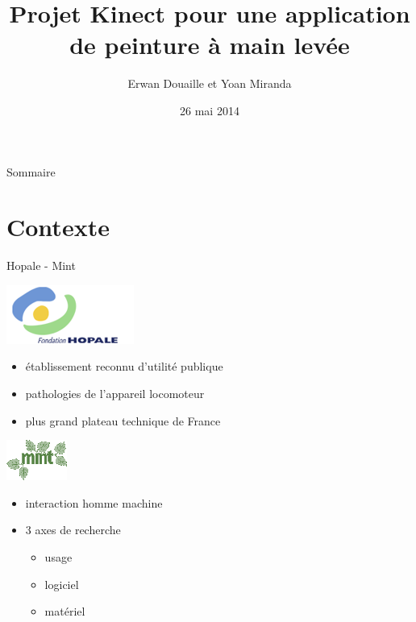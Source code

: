 \documentclass[12pt]{beamer}
\title[Soutenance de stage]{Projet Kinect pour une application de peinture à main levée}
\author[Erwan Douaille et Yoan Miranda]{Erwan Douaille et Yoan Miranda}
\date{26 mai 2014}
\begin{document}
\begin{frame}
	\titlepage
\end{frame}

\begin{frame}{Sommaire}
	\tableofcontents[]
\end{frame}      
	

\section{Contexte}

\begin{frame}{Hopale - Mint}
	\begin{center}
		\includegraphics[scale=0.5]{images/hopale.png}
	\end{center}
	\begin{itemize}
		\item établissement reconnu d'utilité publique
		\item pathologies de l’appareil locomoteur
		\item plus grand plateau technique de France
	\end{itemize}
	\begin{center}
		\includegraphics[scale=0.7]{images/mint.png}
	\end{center}
	\begin{itemize}
		\item interaction homme machine
		\item 3 axes de recherche
		\begin{itemize}
			\item usage
			\item logiciel
			\item matériel
		\end{itemize}
	\end{itemize}
\end{frame}
\end{document}

